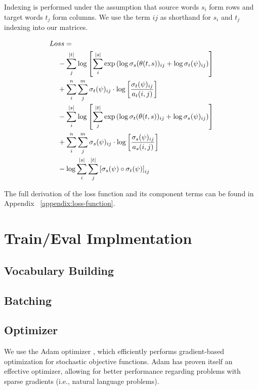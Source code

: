 \documentclass[twoside,twocolumn]{article}
\begin{document}
Indexing is performed under the assumption that source words $s_i$ form rows
and target words $t_j$ form columns. We use the term $ij$ as shorthand
for $s_i$ and $t_j$ indexing into our matrices.

\begin{equation}
  \centering
\begin{split}
  Lo&ss = \\
  &- \sum_j^{|t|} \log \left[
      \sum_i^{|s|} \exp \left(
        \log \sigma_s(\theta(t, s))_{ij} + \log \sigma_t(\psi)_{ij} \right)
    \right] \\
  &+ \sum_i^n \sum_j^m \sigma_t(\psi)_{ij} \cdot \log \left[
    \frac{\sigma_t(\psi)_{ij}}{a_t(i, j)} \right] \\
  &- \sum_i^{|s|} \log \left[ \sum_j^{|t|}
      \exp \left(
        \log \sigma_t(\theta(t, s))_{ij} + \log \sigma_s(\psi)_{ij}
      \right)
    \right] \\
  &+ \sum_i^n \sum_j^m \sigma_s(\psi)_{ij} \cdot \log \left[
    \frac{\sigma_s(\psi)_{ij}}{a_s(i, j)} \right] \\
  &- \log \sum_i^{|s|} \sum_j^{|t|} \left[
    \sigma_s(\psi) \circ \sigma_t(\psi) \right]_{ij} \\
\end{split}
\end{equation}

The full derivation of the loss function and its component terms can be found
in Appendix ~\ref{appendix:loss-function}.


\section{Train/Eval Implmentation}

\subsection{Vocabulary Building}

\subsection{Batching}

\subsection{Optimizer}
We use the Adam optimizer \cite{kingma2014adam}, which efficiently performs
gradient-based optimization for stochastic objective functions. Adam has proven
itself an effective optimizer, allowing for better performance regarding
problems with sparse gradients (i.e., natural language problems).
\end{document}

